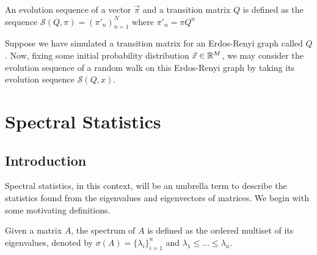 \begin{definition}
An evolution sequence of a vector $\vec{\pi}$ and a transition matrix $Q$ is defined as the sequence $\mathcal{S}(Q,\pi) = ( \pi'_n )_{n=1}^N$ where $ \pi'_n  = \pi Q^n$
\end{definition}

Suppose we have simulated a transition matrix for an Erdos-Renyi graph called $Q$. Now, fixing some initial probability distribution $\vec{x} \in \mathbb{R}^M$, we may consider the evolution sequence of a random walk on this Erdos-Renyi graph by taking its evolution sequence $\mathcal{S}(Q, x)$.

\chapter{Spectral Statistics}
\section{Introduction}
Spectral statistics, in this context, will be an umbrella term to describe the statistics found from the eigenvalues and eigenvectors of matrices. We begin with some motivating definitions.

\begin{definition}[Spectrum]
Given a matrix $A$, the spectrum of $A$ is defined as the ordered multiset of its eigenvalues, denoted by $\sigma(A) = \{\lambda_i\}_{i=1}^n$  and $\lambda_1 \leq \dots  \leq \lambda_n$.
\end{definition}


